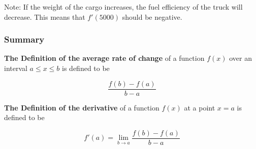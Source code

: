 \documentclass[pdftex, brazil, 12pt, twoside]{article}
\begin{document}
Note: If the weight of the cargo increases, the fuel efficiency of the truck will
decrease. This means that $f'(5000)$ should be negative.

\subsubsection{Summary}
\label{u1-what-summary}

\textbf{The Definition of the average rate of change} of a function $f(x)$
over an interval $a \le x \le b$ is defined to be

\begin{equation}
  \frac{f(b) - f(a)}{b-a}
\end{equation}

\textbf{The Definition of the derivative} of a function $f(x)$
at a point $x=a$ is defined to be

\begin{equation}
  f'(a) = \lim_{b \to a}\frac{f(b) - f(a)}{b-a}
\end{equation}




\end{document}
